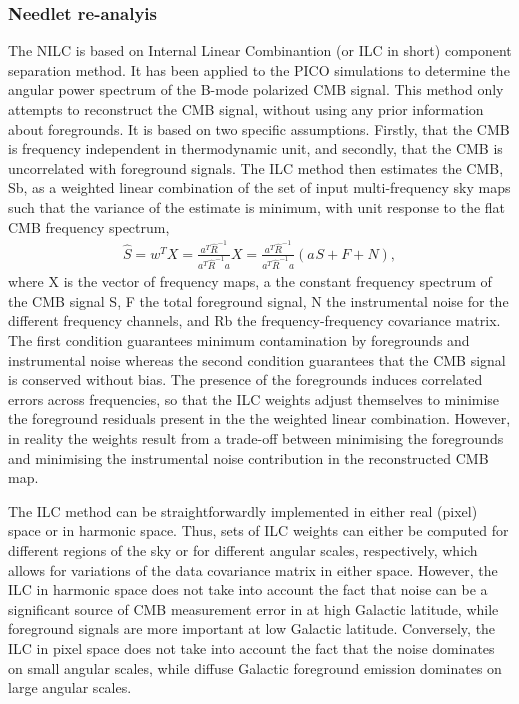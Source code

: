 \documentclass[PICOReport.tex]{subfiles}
\begin{document}
\subsubsection{Needlet re-analyis}

The NILC is based on Internal Linear Combinantion (or ILC in short) component separation method. It has been applied to the PICO simulations to determine the angular power spectrum of the B-mode polarized CMB signal. This method only attempts to reconstruct the CMB signal, without using any prior information about foregrounds. It is based on two specific assumptions. Firstly, that the CMB is frequency independent in thermodynamic unit, and secondly, that the CMB is uncorrelated with foreground signals. The ILC method then estimates the CMB, Sb, as a weighted linear combination of the set of input multi-frequency sky maps such that the variance of the estimate is minimum, with unit response to the flat CMB frequency spectrum,
\begin{eqnarray} 
\widehat S = w^{T} X = \frac{\displaystyle{a^{T} \widehat R^{-1}}}{\displaystyle{a^{T} \widehat R^{-1} a}} X =\frac{\displaystyle{a^{T} \widehat R^{-1}}}{\displaystyle{a^{T} \widehat R^{-1} a}} \left(a^{ } S + F + N\right),
\label{equ:ilc} 
\end{eqnarray}
where X is the vector of frequency maps, a the constant frequency spectrum of the CMB signal S, F the total foreground signal, N the instrumental noise for the different frequency channels, and Rb the frequency-frequency covariance matrix. The first condition guarantees minimum contamination by foregrounds and instrumental noise whereas the second condition
guarantees that the CMB signal is conserved without bias. The presence of the foregrounds induces correlated errors across frequencies, so that the ILC weights adjust themselves to minimise the foreground residuals present in the the weighted linear combination. However, in reality the weights result from a trade-off between minimising the foregrounds and minimising
the instrumental noise contribution in the reconstructed CMB map.

The ILC method can be straightforwardly implemented in either real
(pixel) space or in harmonic space. Thus, sets of ILC weights can
either be computed for different regions of the sky or for different
angular scales, respectively, which allows for variations of the data
covariance matrix in either space.  However, the ILC in harmonic space
does not take into account the fact that noise can be a significant
source of CMB measurement error in at high Galactic latitude, while
foreground signals are more important at low Galactic
latitude. Conversely, the ILC in pixel space does not take into
account the fact that the noise dominates on small angular scales,
while diffuse Galactic foreground emission dominates on large angular
scales.
\end{document}
